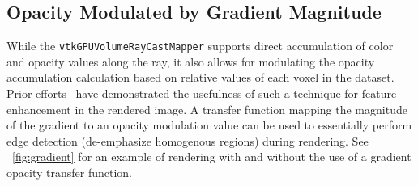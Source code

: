 \subsection{Opacity Modulated by Gradient Magnitude}
\label{opacity-modulated-by-gradient-magnitude}
While the \texttt{vtkGPUVolumeRayCastMapper} supports direct accumulation of
color and opacity values along the ray, it also allows for modulating the
opacity accumulation calculation based on relative values of each voxel in the
dataset. Prior efforts~\citep{marchesin_per-pixel_2010} have demonstrated the
usefulness of such a technique for feature enhancement in the rendered image. A
transfer function mapping the magnitude of the gradient to an opacity modulation
value can be used to essentially perform edge detection (de-emphasize homogenous
regions) during rendering. See ~\autoref{fig:gradient} for an example of
rendering with and without the use of a gradient opacity transfer function.

